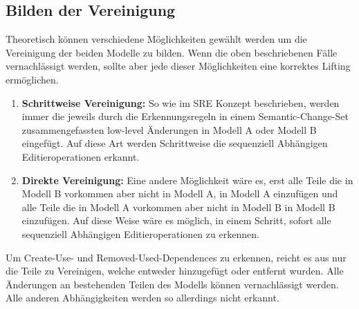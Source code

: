 \subsection{Bilden der Vereinigung}

Theoretisch können verschiedene Möglichkeiten gewählt werden um die Vereinigung der beiden Modelle
zu bilden. Wenn die oben beschriebenen Fälle vernachlässigt werden, sollte aber jede dieser
Möglichkeiten eine korrektes Lifting ermöglichen.

\begin{enumerate}
  \item \textbf{Schrittweise Vereinigung:} So wie im SRE Konzept beschrieben, werden immer die
  jeweils durch die Erkennungsregeln in einem Semantic-Change-Set zusammengefassten low-level
  Änderungen in Modell A oder Modell B eingefügt. Auf diese Art werden Schrittweise die
  sequenziell Abhängigen Editieroperationen erkannt.
  \item \textbf{Direkte Vereinigung:} Eine andere Möglichkeit wäre es, erst alle Teile die in
  Modell B vorkommen aber nicht in Modell A, in Modell A einzufügen und alle Teile die in Modell
  A vorkommen aber nicht in Modell B in Modell B einzufügen. Auf diese Weise wäre es möglich, in
  einem Schritt, sofort alle sequenziell Abhängigen Editieroperationen zu erkennen.
\end{enumerate}

Um Create-Use- und Removed-Used-Dependences zu erkennen, reicht es aus nur die Teile zu Vereinigen,
welche entweder hinzugefügt oder entfernt wurden. Alle Änderungen an bestehenden Teilen des
Modells können vernachlässigt werden. Alle anderen Abhängigkeiten werden so allerdings nicht
erkannt.

